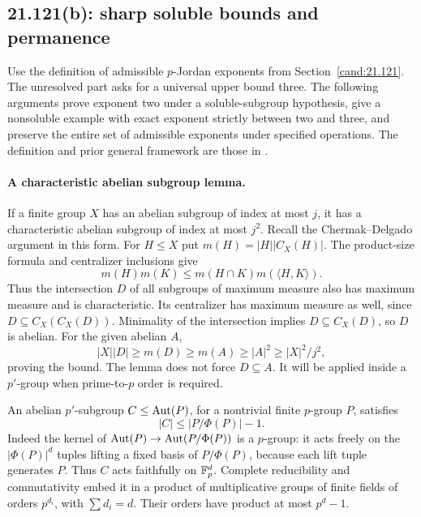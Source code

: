 \subsection{21.121(b): sharp soluble bounds and permanence}
\label{partial:jordan}

Use the definition of admissible \(p\)-Jordan exponents from
Section~\ref{cand:21.121}. The unresolved part asks for a universal
upper bound three. The following arguments prove exponent two
under a soluble-subgroup hypothesis, give a nonsoluble example
with exact exponent strictly between two and three, and preserve
the entire set of admissible exponents under specified operations.
The definition and prior general framework are those in
\cite{hu-jordan,chen-shramov}.

\paragraph{A characteristic abelian subgroup lemma.}
If a finite group \(X\) has an abelian subgroup of index at most
\(j\), it has a characteristic abelian subgroup of index at most
\(j^2\). Recall the Chermak--Delgado argument in this form.
For \(H\le X\) put \(m(H)=|H||C_X(H)|\).
The product-size formula and centralizer inclusions give
\[
 m(H)m(K)\le m(H\cap K)m(\langle H,K\rangle).
\]
Thus the intersection \(D\) of all subgroups of maximum measure
also has maximum measure and is characteristic. Its centralizer
has maximum measure as well, since \(D\subseteq C_X(C_X(D))\).
Minimality of the intersection implies \(D\subseteq C_X(D)\),
so \(D\) is abelian. For the given abelian \(A\),
\[
 |X||D|\ge m(D)\ge m(A)\ge |A|^2\ge |X|^2/j^2,
\]
proving the bound. The lemma does not force \(D\subseteq A\).
It will be applied inside a \(p'\)-group when prime-to-\(p\)
order is required.

An abelian \(p'\)-subgroup \(C\le\operatorname{Aut}(P)\), for a nontrivial
finite \(p\)-group \(P\), satisfies
\[
 |C|\le |P/\Phi(P)|-1.
\]
Indeed the kernel of \(\operatorname{Aut}(P)\to\operatorname{Aut}(P/\Phi(P))\) is a \(p\)-group:
it acts freely on the \(|\Phi(P)|^d\) tuples lifting a fixed
basis of \(P/\Phi(P)\), because each lift tuple generates \(P\).
Thus \(C\) acts faithfully on \(\mathbb F_p^d\). Complete reducibility
and commutativity embed it in a product of multiplicative groups
of finite fields of orders \(p^{d_i}\), with \(\sum d_i=d\).
Their orders have product at most \(p^d-1\).

